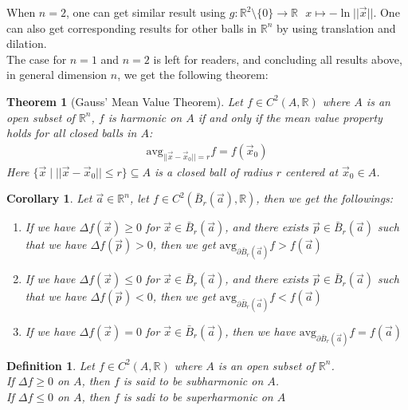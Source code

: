 \documentclass[15pt]{book}
\theoremstyle{break}
\theoremstyle{break}
\newtheorem{thm}{Theorem}[section]
\newtheorem{corT}[lem]{Corollary}
\newtheorem{defn}{Definition}[corL]
\newcommand{\R}{\mathbb{R}}
\begin{document}
When $n=2$, one can get similar result using $g:\R^2 \setminus \{0\}\to \R \ \ \  x\mapsto -\ln||\vec{x}||$. One can also get corresponding results for other balls in $\R^n$ by using translation and dilation. \\

The case for $n=1$ and $n=2$ is left for readers, and concluding all results above, in general dimension $n$, we get the following theorem:

\begin{thm}[Gauss' Mean Value Theorem]
Let $f \in C^2(A,\R)$ where $A$ is an open subset of $\R^n$, $f$ is harmonic on $A$ if and only if the  mean value property holds for all closed balls in $A$:
\begin{align*}
\text{avg}_{||\vec{x} - \vec{x}_0||=r}f = f(\vec{x}_0)
\end{align*}
Here $\{\vec{x}\mid ||\vec{x} - \vec{x}_0||\leq r\} \subseteq A$ is a closed ball of radius $r$ centered at $\vec{x}_0 \in A$.
\end{thm}

\begin{corT}
Let $\vec{a}\in \R^n$, let $f \in C^2(\bar{B}_r(\vec{a}), \R)$, then we get the followings:
\begin{enumerate}[topsep=3pt,itemsep=-1ex,partopsep=1ex,parsep=1ex]
\item If we have $\Delta f(\vec{x}) \geq 0$ for $\vec{x}\in \bar{B}_r(\vec{a})$, and there exists $ \vec{p}\in \bar{B}_r(\vec{a})$ such that we have $\Delta f(\vec{p}) >0$, then we get $\text{avg}_{\partial \bar{B}_r(\vec{a})} f > f(\vec{a})$
\item If we have $\Delta f(\vec{x}) \leq 0$ for $\vec{x}\in \bar{B}_r(\vec{a})$, and there exists $\vec{p}\in \bar{B}_r(\vec{a})$ such that we have $\Delta f(\vec{p}) <0$, then we get $\text{avg}_{\partial \bar{B}_r(\vec{a})} f < f(\vec{a})$
\item If we have $\Delta f(\vec{x}) = 0$ for $\vec{x}\in \bar{B}_r(\vec{a})$, then we have $\text{avg}_{\partial \bar{B}_r(\vec{a})} f = f(\vec{a})$
\end{enumerate}
\end{corT}
\begin{defn}
Let $f \in C^2(A,\R)$ where $A$ is an open subset of $\R^n$.\\
If $\Delta f \geq 0$ on $A$, then $f$ is said to be subharmonic on $A$. \\
If $\Delta f \leq 0$ on $A$, then $f$ is sadi to be superharmonic on $A$
\end{defn}
\end{document}
